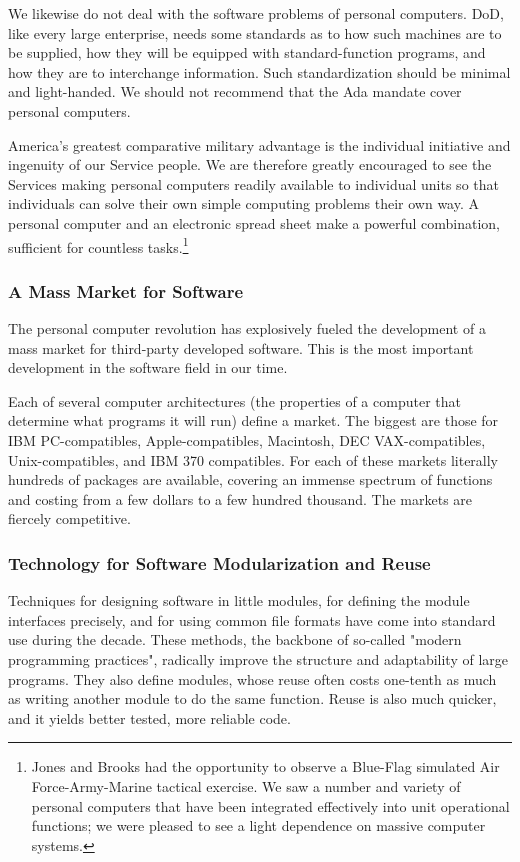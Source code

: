 \documentclass[12pt]{article}
\begin{document}
We likewise do not deal with the software problems of personal computers. DoD,
like every large enterprise, needs some standards as to how such machines are
to be supplied, how they will be equipped with standard-function programs, and
how they are to interchange information. Such standardization should be
minimal and light-handed. We should not recommend that the Ada mandate cover
personal computers. %

America's greatest comparative military advantage is the individual initiative
and ingenuity of our Service people. We are therefore greatly encouraged to see
the Services making personal computers readily available to individual units so
that individuals can solve their own simple computing problems their own way. A
personal computer and an electronic spread sheet make a powerful combination,
sufficient for countless tasks.\footnote{Jones and Brooks had the opportunity
to observe a Blue-Flag simulated Air Force-Army-Marine tactical exercise. We
saw a number and variety of personal computers that have been integrated
effectively into unit operational functions; we were pleased to see a light
dependence on massive computer systems.}

\subsubsection*{A Mass Market for Software}

The personal computer revolution has explosively fueled the development of a
mass market for third-party developed software. This is the most important
development in the software field in our time.

Each of several computer architectures (the properties of a computer that
determine what programs it will run) define a market. The biggest are those for
IBM PC-compatibles, Apple-compatibles, Macintosh, DEC VAX-compatibles,
Unix-compatibles, and IBM 370 compatibles. For each of these markets literally
hundreds of packages are available, covering an immense spectrum of functions
and costing from a few dollars to a few hundred thousand. The markets are
fiercely competitive.

\subsubsection*{Technology for Software Modularization and Reuse}

Techniques for designing software in little modules, for defining the module
interfaces precisely, and for using common file formats have come into standard
use during the decade. These methods, the backbone of so-called "modern
programming practices", radically improve the structure and adaptability of
large programs. They also define modules, whose reuse often costs one-tenth as
much as writing another module to do the same function. Reuse is also much
quicker, and it yields better tested, more reliable code.
\end{document}
